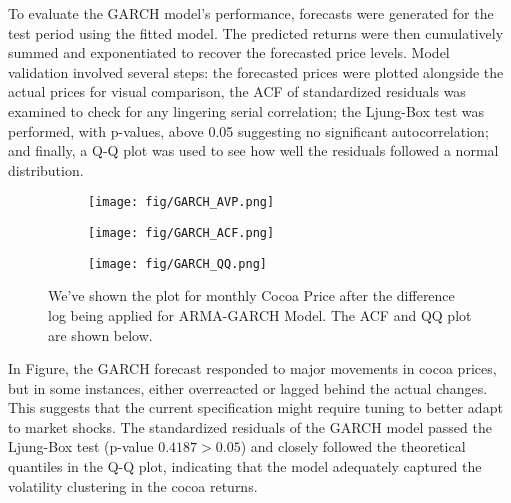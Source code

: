 \documentclass[10pt]{article}
\begin{document}
\noindent
To evaluate the GARCH model’s performance, forecasts were generated for the test period using the fitted model. The predicted returns were then cumulatively summed and exponentiated to recover the forecasted price levels. Model validation involved several steps: the forecasted prices were plotted alongside the actual prices for visual comparison, the ACF of standardized residuals was examined to check for any lingering serial correlation; the Ljung-Box test was performed, with p-values, above 0.05 suggesting no significant autocorrelation; and finally, a Q-Q plot was used to see how well the residuals followed a normal distribution.
\begin{figure}[h!]
    \captionsetup{font=scriptsize}
    \centering
    \begin{subfigure}[b]{0.7\textwidth}
        \centering
        \texttt{[image: fig/GARCH\_AVP.png]}
        \label{fig:m5_c1}
    \end{subfigure}
    \vspace{1em}
    \begin{subfigure}[b]{0.45\textwidth}
        \centering
        \texttt{[image: fig/GARCH\_ACF.png]}
        \label{fig:m5_c2}
    \end{subfigure}
    \begin{subfigure}[b]{0.45\textwidth}
        \centering
        \texttt{[image: fig/GARCH\_QQ.png]}
        \label{fig:m5_qq}
    \end{subfigure}
    \caption{We've shown the plot for monthly Cocoa Price after the difference log being applied for ARMA-GARCH Model. The ACF and QQ plot are shown below.}
    \label{fig:diff_lof}
\end{figure}

\noindent
In Figure, the GARCH forecast responded to major movements in cocoa prices, but in some instances, either overreacted or lagged behind the actual changes. This suggests that the current specification might require tuning to better adapt to market shocks. The standardized residuals of the GARCH model passed the Ljung-Box test (p-value $0.4187 > 0.05$) and closely followed the theoretical quantiles in the Q-Q plot, indicating that the model adequately captured the volatility clustering in the cocoa returns.

\newpage
\end{document}
